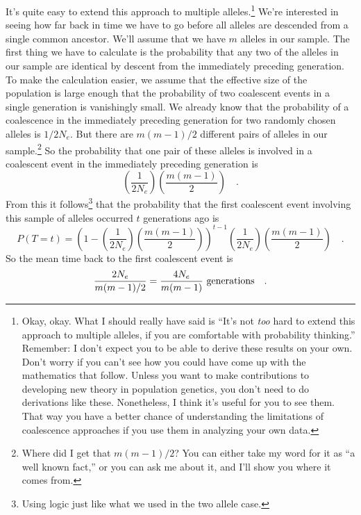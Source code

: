 \documentclass[12pt]{article}
\begin{document}
It's quite easy to extend this approach to multiple
alleles.\footnote{Okay, okay. What I should really have said is ``It's
  not {\it too\/} hard to extend this approach to multiple alleles, if
  you are comfortable with probability thinking.'' Remember: I don't
  expect you to be able to derive these results on your own. Don't
  worry if you can't see how you could have come up with the
  mathematics that follow. Unless you want to make contributions to
  developing new theory in population genetics, you don't need to do
  derivations like these. Nonetheless, I think it's useful for you to
  see them. That way you have a better chance of understanding the
  limitations of coalescence approaches if you use them in analyzing
  your own data.}  We're interested in seeing how far back in time we
have to go before all alleles are descended from a single common
ancestor. We'll assume that we have $m$ alleles in our sample. The
first thing we have to calculate is the probability that any two of
the alleles in our sample are identical by descent from the
immediately preceding generation. To make the calculation easier, we
assume that the effective size of the population is large enough that
the probability of two coalescent events in a single generation is
vanishingly small. We already know that the probability of a
coalescence in the immediately preceding generation for two randomly
chosen alleles is $1/2N_e$. But there are $m(m-1)/2$ different pairs
of alleles in our sample.\footnote{Where did I get that $m(m-1)/2$?
  You can either take my word for it as ``a well known fact,'' or you
  can ask me about it, and I'll show you where it comes from.} So the
probability that one pair of these alleles is involved in a coalescent
event in the immediately preceding generation is
\begin{equation}
  \left(\frac{1}{2N_e}\right)\left(\frac{m(m-1)}{2}\right) \quad .
  \label{eq:multi-allele-first-event}
\end{equation}
From this it follows\footnote{Using logic just like what we used in
the two allele case.} that the probability that the first coalescent
event involving this sample of alleles occurred $t$ generations ago is
\begin{equation}
P(T=t) =
\left(1-\left(\frac{1}{2N_e}\right)\left(\frac{m(m-1)}{2}\right)\right)^{t-1}
\left(\frac{1}{2N_e}\right)\left(\frac{m(m-1)}{2}\right)
\quad .
\label{eq:multi-allele}
\end{equation}
So the mean time back to the first coalescent event is
\[
\frac{2N_e}{m(m-1)/2} = \frac{4N_e}{m(m-1)} \hbox{ generations} \quad .
\]
\end{document}

